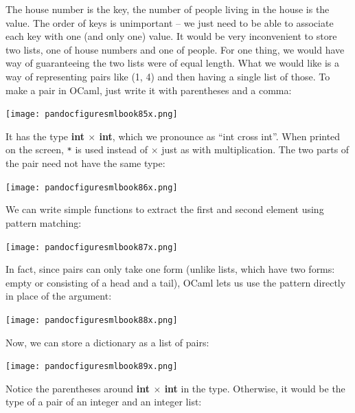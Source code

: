 \documentclass[]{book}
\begin{document}
\noindent The house number is the key, the number of people living in the house is the value. The order of keys is unimportant -- we just need to be able to associate each key with one (and only one) value. It would be very inconvenient to store two lists, one of house numbers and one of people. For one thing, we would have way of guaranteeing the two lists were of equal length. What we would like is a way of representing pairs like (1, 4) and then having a single list of those. To make a pair in OCaml, just write it with parentheses and a comma:


\medskip
\begin{center}
\noindent\texttt{[image: pandocfiguresmlbook85x.png]}
\end{center}
\medskip

\noindent It has the type \index{$\times$}\textbf{\textsf{int $\times$ int}}, which we pronounce as ``int cross int''. When printed on the screen, \texttt{*} is used instead of $\times$ just as with multiplication. The two parts of the pair need not have the same type:

\medskip
\begin{center}
\noindent\texttt{[image: pandocfiguresmlbook86x.png]}
\end{center}
\medskip

\noindent We can write simple functions to extract the first and second element using pattern matching:

\medskip
\begin{center}
\noindent\texttt{[image: pandocfiguresmlbook87x.png]}
\end{center}
\medskip

\noindent In fact, since pairs can only take one form (unlike lists, which have two forms: empty or consisting of a head and a tail), OCaml lets us use the pattern directly in place of the argument:

\medskip
\begin{center}
\noindent\texttt{[image: pandocfiguresmlbook88x.png]}
\end{center}
\medskip

\noindent Now, we can store a dictionary as a list of pairs:

\medskip
\begin{center}
\noindent\texttt{[image: pandocfiguresmlbook89x.png]}
\end{center}
\medskip

\noindent Notice the parentheses around \textsf{\textbf{int $\times$ int}} in the type. Otherwise, it would be the type of a pair of an integer and an integer list:
\end{document}
